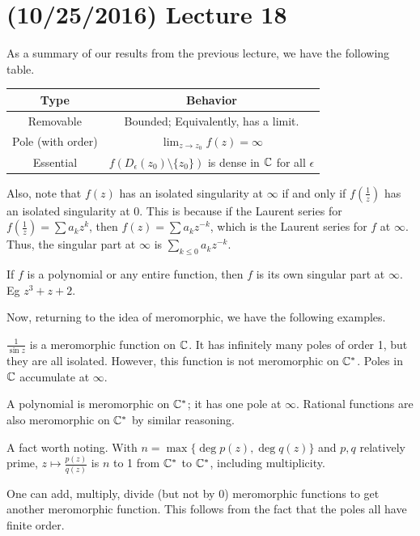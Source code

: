 \documentclass[11pt,leqno,oneside]{amsart}
\numberwithin{thm}{section}
\begin{document}
  \section{(10/25/2016) Lecture 18}
  As a summary of our results from the previous lecture, we have the
  following table. \\
  \begin{tabular}{|c|c|}
    \hline
    Type & Behavior \\
    \hline
    Removable & Bounded; Equivalently, has a limit. \\
    Pole (with order) & $\lim_{z \to z_0} f(z) = \infty$ \\
    Essential & $f(D_\epsilon(z_0) \setminus \{z_0\})$ is dense in
                ${\mathbb C}$ for all $\epsilon$ \\
    \hline
  \end{tabular}
  Also, note that $f(z)$ has an isolated singularity at $\infty$ if
  and only if $f(\frac{1}{z})$ has an isolated singularity at 0. This
  is because if the Laurent series for $f(\frac{1}{z}) = \sum a_k
  z^k$, then $f(z) = \sum a_k z^{-k}$, which is the Laurent series for
  $f$ at $\infty$. Thus, the singular part at $\infty$ is $\sum_{k
    \leq 0} a_kz^{-k}$.
  \begin{example}
    If $f$ is a polynomial or any entire function, then $f$ is its own
    singular part at $\infty$. Eg $z^3+z+2$.
  \end{example}
  Now, returning to the idea of meromorphic, we have the following
  examples.
  \begin{example}
    $\frac{1}{\sin z}$ is a meromorphic function on ${\mathbb C}$. It has
    infinitely many poles of order 1, but they are all
    isolated. However, this function is not meromorphic on
    ${\mathbb C}^*$. Poles in ${\mathbb C}$ accumulate at $\infty$.
  \end{example}
  \begin{example}
    A polynomial is meromorphic on ${\mathbb C}^*$; it has one pole at
    $\infty$. Rational functions are also meromorphic on ${\mathbb C}^*$ by
    similar reasoning.
  \end{example}
  A fact worth noting. With $n = \max\{ \operatorname{deg} p(z),
  \operatorname{deg} q(z) \}$ and $p,q$ relatively prime, $z \mapsto
  \frac{p(z)}{q(z)}$ is $n$ to 1 from ${\mathbb C}^*$ to ${\mathbb C}^*$, including
  multiplicity.
  \begin{rmk}
    One can add, multiply, divide (but not by 0) meromorphic functions
    to get another meromorphic function. This follows from the fact
    that the poles all have finite order.
  \end{rmk}
\end{document}
